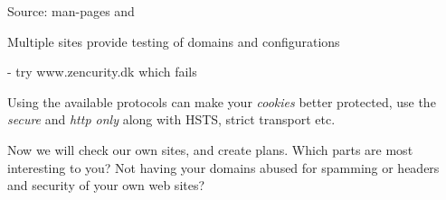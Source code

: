 \documentclass[Screen16to9,17pt]{foils}
\begin{document}
Source: man-pages and\\ 






\begin{list1}
\item Multiple sites provide testing of domains and configurations
\item {}
\item {}
\item {} - try www.zencurity.dk which fails
\item {}
\item {}
\item {}
\item Using the available protocols can make your \emph{cookies} better protected, use the \emph{secure} and \emph{http only} along with HSTS, strict transport etc.
\end{list1}

Now we will check our own sites, and create plans. Which parts are most interesting to you? Not having your domains abused for spamming or headers and security of your own web sites?





\slidenext
\end{document}

